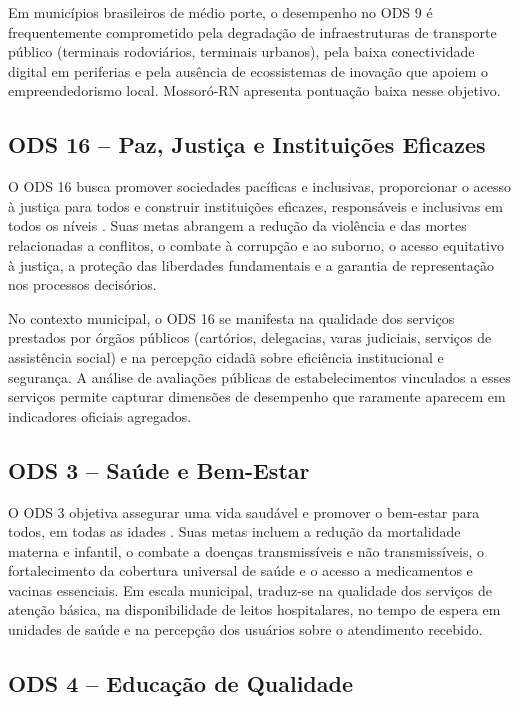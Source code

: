 Em municípios brasileiros de médio porte, o desempenho no ODS 9 é frequentemente
comprometido pela degradação de infraestruturas de transporte público (terminais rodoviários,
terminais urbanos), pela baixa conectividade digital em periferias e pela ausência de ecossistemas
de inovação que apoiem o empreendedorismo local. Mossoró-RN apresenta pontuação baixa nesse objetivo.

\subsection{ODS 16 -- Paz, Justiça e Instituições Eficazes}
\label{subsec:ods16}

O ODS 16 busca promover sociedades pacíficas e inclusivas, proporcionar o acesso à
justiça para todos e construir instituições eficazes, responsáveis e inclusivas em todos os níveis
\cite{onu2015}. Suas metas abrangem a redução da violência e das mortes relacionadas a conflitos,
o combate à corrupção e ao suborno, o acesso equitativo à justiça, a proteção das liberdades
fundamentais e a garantia de representação nos processos decisórios.

No contexto municipal, o ODS 16 se manifesta na qualidade dos serviços prestados por
órgãos públicos (cartórios, delegacias, varas judiciais, serviços de assistência social) e na
percepção cidadã sobre eficiência institucional e segurança. A análise de avaliações públicas de
estabelecimentos vinculados a esses serviços permite capturar dimensões de desempenho que
raramente aparecem em indicadores oficiais agregados.

\subsection{ODS 3 -- Saúde e Bem-Estar}
\label{subsec:ods3}

O ODS 3 objetiva assegurar uma vida saudável e promover o bem-estar para todos, em
todas as idades \cite{onu2015}. Suas metas incluem a redução da mortalidade materna e infantil,
o combate a doenças transmissíveis e não transmissíveis, o fortalecimento da cobertura universal
de saúde e o acesso a medicamentos e vacinas essenciais. Em escala municipal, traduz-se na
qualidade dos serviços de atenção básica, na disponibilidade de leitos hospitalares, no tempo de
espera em unidades de saúde e na percepção dos usuários sobre o atendimento recebido.

\subsection{ODS 4 -- Educação de Qualidade}
\label{subsec:ods4}

